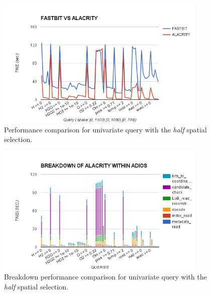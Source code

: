 \documentclass[11pt,a4paper]{article}
\begin{document}
\begin{figure}[ht]             
\begin{center}                 
    \includegraphics[width=0.90\textwidth]{figures/perf/alac-adios/uniquery-half-space}
\end{center}
\caption{Performance comparison for univariate query with the \emph{half} spatial selection.}
\label{fig:uniquery-half}  
\end{figure}


\begin{figure}[ht]             
\begin{center}                 
    \includegraphics[width=0.90\textwidth]{figures/perf/alac-adios/breakdown-uniquery-half-space}
\end{center}
\caption{Breakdown performance comparison for univariate query with the \emph{half} spatial selection.}
\label{fig:uniquery-half-breakdown}  
\end{figure}
\end{document}
